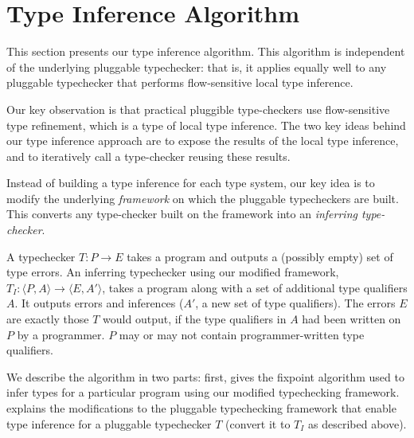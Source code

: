 \section{Type Inference Algorithm}
\label{sec:algorithm}

This section presents our type inference algorithm. This algorithm is
independent of the underlying pluggable typechecker: that is,
it applies equally well to any pluggable typechecker that performs flow-sensitive
local type inference.



Our key observation is that practical pluggible type-checkers use 
flow-sensitive type refinement, which is a type of local type inference.
The two key ideas behind our type inference approach are to expose the
results of the local type inference, and to iteratively call a type-checker
reusing these results.

Instead of building a type inference for each type system,
our key idea is to modify the underlying \emph{framework}
on which the pluggable typecheckers are built.  This converts any
type-checker built on the framework into an \emph{inferring type-checker}.


A typechecker $T : P \rightarrow E$
takes a program and outputs a (possibly empty) set of
type errors.  An inferring typechecker using our modified framework,
$T_I : \langle P, A \rangle \rightarrow \langle E, A' \rangle$,
takes a program along with a set of additional type qualifiers $A$.
It outputs errors and
inferences (\ie $A'$, a new set of type qualifiers).
The errors $E$ are exactly those $T$ would output, if the
type qualifiers in $A$ had been written on $P$ by a programmer.
$P$ may or may not contain programmer-written type qualifiers.

We describe the algorithm in two parts: first,
 gives the fixpoint
algorithm used to infer types for a particular program
using our modified typechecking framework.
 explains the modifications to the pluggable
typechecking framework that enable type inference for a pluggable
typechecker $T$ (\ie convert it to $T_I$ as described above).

